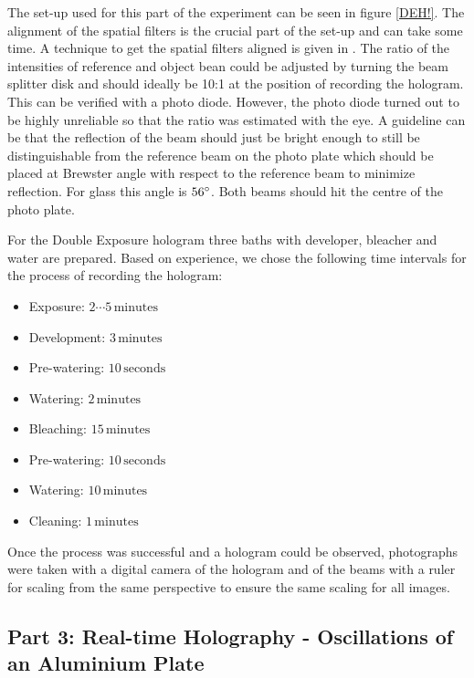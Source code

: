The set-up used for this part of the experiment can be seen in figure \ref{DEH!}. The alignment of the spatial filters is the crucial part of the set-up and can take some time. A technique to get the spatial filters aligned is given in \cite{anleitung}.
The ratio of the intensities of reference and object bean could be adjusted by turning the beam splitter disk and should ideally be 10:1 at the position of recording the hologram. This can be verified with a photo diode. However, the photo diode turned out to be highly unreliable so that the ratio was estimated with the eye. A guideline can be that the reflection of the beam should just be bright enough to still be distinguishable from the reference beam on the photo plate which should be placed at Brewster angle with respect to the reference beam to minimize reflection. For glass this angle is $56 ^\circ$. Both beams should hit the centre of the photo plate.  


For the Double Exposure hologram three baths with developer, bleacher and water are prepared. Based on experience, we chose the following time intervals for the process of recording the hologram:

\begin{itemize}
	\item Exposure: $2 \cdots 5\,\mathrm{minutes}$
	\item Development: $3\,\mathrm{minutes}$
	\item Pre-watering: $10\,\mathrm{seconds}$
	\item Watering: $2\,\mathrm{minutes}$
	\item Bleaching: $15\,\mathrm{minutes}$
	\item Pre-watering: $10\,\mathrm{seconds}$
	\item Watering: $10\,\mathrm{minutes}$
	\item Cleaning: $1\,\mathrm{minutes}$
\end{itemize}

Once the process was successful and a hologram could be observed, photographs were taken with a digital camera of the hologram and of the beams with a ruler for scaling from the same perspective to ensure the same scaling for all images.



\subsection{Part 3: Real-time Holography - Oscillations of an Aluminium Plate \label{RTH}}

